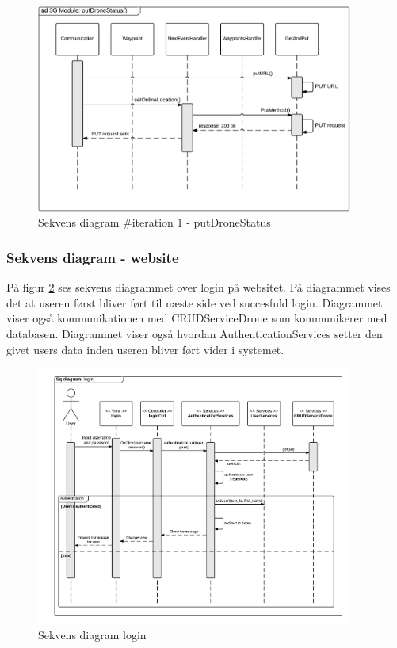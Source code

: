 \begin{figure}[H]
	\centering
	\includegraphics[width=0.93\textwidth]{Billeder/sekvens/sekvens_iteration1_putdronestatus}
	\caption{Sekvens diagram \#iteration 1 - putDroneStatus}
	\label{fig:Sekvens_diagram_putDroneStatus}
\end{figure}

\subsubsection*{Sekvens diagram - website}
På figur \ref{fig:Sekvens_diagram_login} ses sekvens diagrammet over login på websitet. På diagrammet vises det at useren først bliver ført til næste side ved succesfuld login. Diagrammet viser også kommunikationen med CRUDServiceDrone som kommunikerer med databasen. Diagrammet viser også hvordan AuthenticationServices setter den givet users data inden useren bliver ført vider i systemet.
\begin{figure}[H]
	\centering
	\includegraphics[width=0.93\textwidth]{Billeder/sekvens/login_sq_diagram.png}
	\caption{Sekvens diagram login}
	\label{fig:Sekvens_diagram_login}
\end{figure}
\newpage




